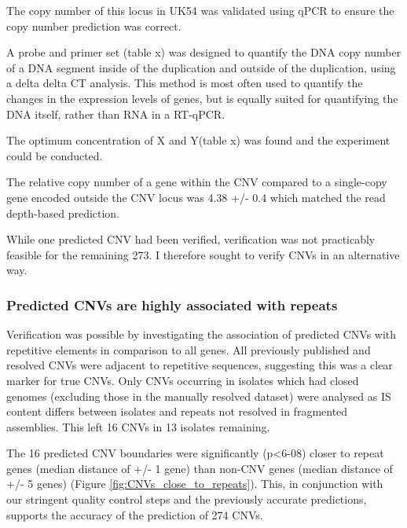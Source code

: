 \documentclass{article}
\begin{document}
The copy number of this locus in UK54 was validated using qPCR to ensure the copy number prediction was correct.

A probe and primer set (table x) was designed to quantify the DNA copy number of a DNA segment inside of the duplication and outside of the duplication, using a delta delta CT analysis. This method is most often used to quantify the changes in the expression levels of genes, but is equally suited for quantifying the DNA itself, rather than RNA in a RT-qPCR.

The optimum concentration of X and Y(table x) was found and the experiment could be conducted.


The relative copy number of a gene within the CNV compared to a single-copy gene encoded outside the CNV locus was 4.38 +/- 0.4 which matched the read depth-based prediction.

While one predicted CNV had been verified, verification was not practicably feasible for the remaining 273. I therefore sought to verify CNVs in an alternative way.

\subsubsection{Predicted CNVs are highly associated with repeats}

Verification was possible by investigating the association of predicted CNVs with repetitive elements in comparison to all genes. All previously published and resolved CNVs were adjacent to repetitive sequences, suggesting this was a clear marker for true CNVs. Only CNVs occurring in isolates which had closed genomes (excluding those in the manually resolved dataset) were analysed as IS content differs between isolates and repeats not resolved in fragmented assemblies. This left 16 CNVs in 13 isolates remaining.

The 16 predicted CNV boundaries were significantly (p<6-08) closer to repeat genes (median distance of +/- 1 gene) than non-CNV genes (median distance of +/- 5 genes) (Figure \ref{fig:CNVs_close_to_repeats}). This, in conjunction with our stringent quality control steps and the previously accurate predictions, supports the accuracy of the prediction of 274 CNVs.
\end{document}
